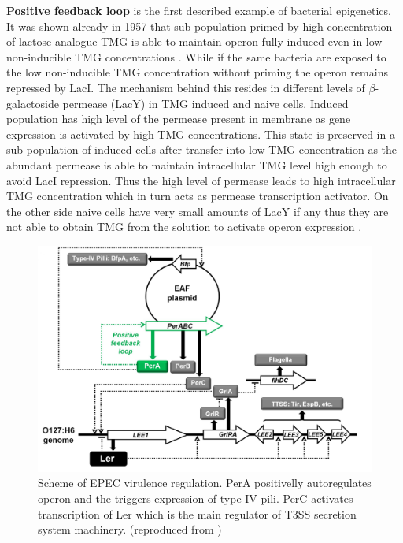 \textbf{Positive feedback loop} is the first described example of bacterial epigenetics.
It was shown already in 1957 that  sub-population primed by high concentration of lactose analogue TMG is able to maintain  operon fully induced even in low non-inducible TMG concentrations \cite{novick1957enzyme}.
While if the same bacteria are exposed to the low non-inducible TMG concentration without priming the  operon remains repressed by LacI.
The mechanism behind this resides in different levels of $\beta$-galactoside permease (LacY) in TMG induced and naive cells.
Induced population has high level of the permease present in membrane as  gene expression is activated by high TMG concentrations.
This state is preserved in a sub-population of induced cells after transfer into low TMG concentration as the abundant permease is able to maintain intracellular TMG level high enough to avoid LacI repression.
Thus the high level of permease leads to high intracellular TMG concentration which in turn acts as permease transcription activator.
On the other side naive cells have very small amounts of LacY if any thus they are not able to obtain TMG from the solution to activate  operon expression \cite{smits2006phenotypic, casadesus2013programmed}.

\begin{figure}[h!]
  \centering
  \includegraphics[scale=0.2]{text/Pictures/perOperonRegulation.jpg}
	\caption{Scheme of EPEC virulence regulation. PerA positivelly autoregulates  operon and the triggers expression of type IV pili. PerC activates transcription of Ler which is the main regulator of T3SS secretion system machinery. (reproduced from \cite{ronin2017long})}
	\label{per}
\end{figure}


